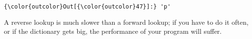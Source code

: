 \documentclass[11pt]{article}
\begin{document}
\begin{Verbatim}[commandchars=\\\{\}]
{\color{outcolor}Out[{\color{outcolor}47}]:} 'p'
\end{Verbatim}
            
    A reverse lookup is much slower than a forward lookup; if you have to do
it often, or if the dictionary gets big, the performance of your program
will suffer.


    
    
    
    
\end{document}
